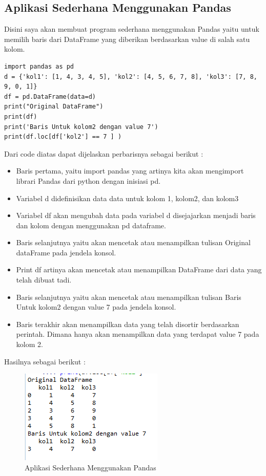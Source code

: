 \subsection{Aplikasi Sederhana Menggunakan Pandas}
Disini saya akan membuat program sederhana menggunakan Pandas yaitu untuk memilih baris dari DataFrame yang diberikan berdasarkan value di salah satu kolom.
\begin{lstlisting}[caption=Code Program Sederhana Pandas,label={lst:3.1}]
import pandas as pd
d = {'kol1': [1, 4, 3, 4, 5], 'kol2': [4, 5, 6, 7, 8], 'kol3': [7, 8, 9, 0, 1]}
df = pd.DataFrame(data=d)
print("Original DataFrame")
print(df)
print('Baris Untuk kolom2 dengan value 7')
print(df.loc[df['kol2'] == 7 ] )
\end{lstlisting}
Dari code diatas dapat dijelaskan perbarisnya sebagai berikut :\\
\begin{itemize}
\item
Baris pertama, yaitu import pandas yang artinya kita akan mengimport librari Pandas dari python dengan inisiasi pd.
\item
Variabel d didefinisikan data data untuk kolom 1, kolom2, dan kolom3 
\item
Variabel df akan mengubah data pada variabel d disejajarkan menjadi baris dan kolom dengan menggunakan pd dataframe.
\item
Baris selanjutnya yaitu akan mencetak atau menampilkan tulisan Original dataFrame pada jendela konsol.
\item
Print df artinya akan mencetak atau menampilkan DataFrame dari data yang telah dibuat tadi.
\item
Baris selanjutnya yaitu akan mencetak atau menampilkan tulisan Baris Untuk kolom2 dengan value 7 pada jendela konsol.
\item
Baris terakhir akan menampilkan data yang telah disortir berdasarkan perintah. Dimana hanya akan menampilkan data yang terdapat value 7 pada kolom 2.
\end{itemize}

Hasilnya sebagai berikut :
\begin{figure}[ht]
\centering
\includegraphics[scale=0.5]{figures/praktek1.png}
\caption{Aplikasi Sederhana Menggunakan Pandas}
\label{Praktek}
\end{figure}

